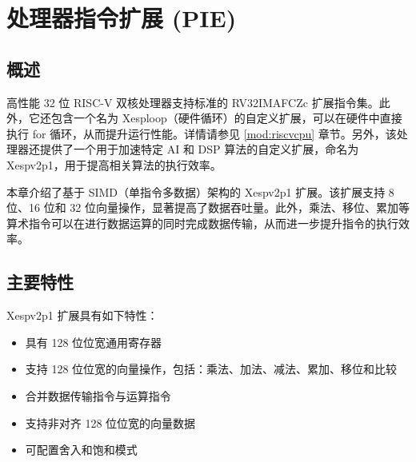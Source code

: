 \documentclass[main\_\_CN.tex]{subfiles}
\begin{document}

\ifglobal
\else
    {\let\clearpage\relax \listoftodos}
    {\let\clearpage\relax \listofdonetodos}
    \tableofcontents
\fi



\hypertarget{pie}{}
\chapter{处理器指令扩展 (PIE)}
\label{mod:pie}

\section{概述}
\chipname{} 高性能 32 位 RISC-V 双核处理器支持标准的 RV32IMAFCZc 扩展指令集。此外，它还包含一个名为 Xesploop（硬件循环）的自定义扩展，可以在硬件中直接执行 for 循环，从而提升运行性能。详情请参见 \ref{mod:riscvcpu} 章节。另外，该处理器还提供了一个用于加速特定 AI 和 DSP 算法的自定义扩展，命名为 Xespv2p1，用于提高相关算法的执行效率。

本章介绍了基于 SIMD（单指令多数据）架构的 Xespv2p1 扩展。该扩展支持 8 位、16 位和 32 位向量操作，显著提高了数据吞吐量。此外，乘法、移位、累加等算术指令可以在进行数据运算的同时完成数据传输，从而进一步提升指令的执行效率。


\section{主要特性}

Xespv2p1 扩展具有如下特性：

\begin{itemize}
    \item 具有 128 位位宽通用寄存器
    \item 支持 128 位位宽的向量操作，包括：乘法、加法、减法、累加、移位和比较
    \item 合并数据传输指令与运算指令
    \item 支持非对齐 128 位位宽的向量数据
    \item 可配置舍入和饱和模式

\end{itemize}
\end{document}
